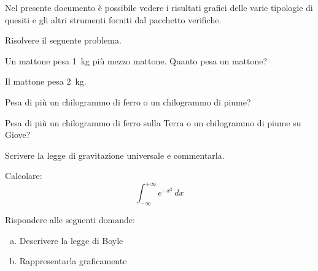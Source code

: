 \documentclass[a4paper, 10pt]{extarticle}
\begin{document}

\printheading

\pagestyle{verifiche}

Nel presente documento è possibile vedere i risultati grafici delle varie tipologie di quesiti e gli altri strumenti forniti dal pacchetto \textsf{verifiche}. 

\begin{esercizio}
Risolvere il seguente problema.

Un mattone pesa \SI{1}{kg} più mezzo mattone. Quanto pesa un mattone?
\end{esercizio}

\begin{soluzione}
Il mattone pesa \SI{2}{kg}.
\end{soluzione}

\begin{esercizio}[pt=2]\label{es:ferropiuma}%
Pesa di più un chilogrammo di ferro o un chilogrammo di piume?
\end{esercizio}

\begin{esercizio}[diff=1]
Pesa di più un chilogrammo di ferro sulla Terra o un chilogrammo di piume su Giove?
\end{esercizio}

\renewcommand{\diffsymb}{$\bullet$}
\begin{esercizio}[diff=2, pt=5]\label{es:grav}%
Scrivere la legge di gravitazione universale e commentarla.
\end{esercizio}

\begin{esercizio}[label=Esercizio]
Calcolare:
\[
\int_{-\infty}^{+\infty} e^{-x^2}\, dx
\]
\end{esercizio}

\begin{esercizio}
Rispondere alle seguenti domande:
\begin{enumerate}[(a)]
\item {} Descrivere la legge di Boyle
\item {} Rappresentarla graficamente
\end{enumerate}
\end{esercizio}
\end{document}
